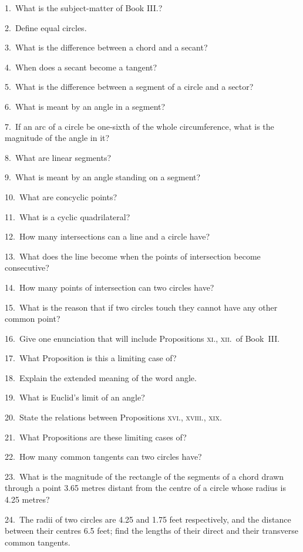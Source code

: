 \documentclass[oneside]{book}
\begin{document}
\begin{footnotesize}
1.~What is the subject-matter of Book III\@.?

2.~Define equal circles.

3.~What is the difference between a chord and a secant?

4.~When does a secant become a tangent?

5.~What is the difference between a segment of a circle and
a sector?

6.~What is meant by an angle in a segment?

7.~If an arc of a circle be one-sixth of the whole circumference,
what is the magnitude of the angle in it?

8.~What are linear segments?

9.~What is meant by an angle standing on a segment?

10.~What are concyclic points?

11.~What is a cyclic quadrilateral?

12.~How many intersections can a line and a circle have?

13.~What does the line become when the points of intersection
become consecutive?

14.~How many points of intersection can two circles have?

15.~What is the reason that if two circles touch they cannot
have any other common point?

16.~Give one enunciation that will include Propositions \textsc{xi.,
xii.}\ of Book~III\@.

17.~What Proposition is this a limiting case of?

18.~Explain the extended meaning of the word angle.

19.~What is Euclid's limit of an angle?

20.~State the relations between Propositions \textsc{xvi., xviii., xix.}

21.~What Propositions are these limiting cases of?

22.~How many common tangents can two circles have?

23.~What is the magnitude of the rectangle of the segments of
a chord drawn through a point 3.65 metres distant from the centre
of a circle whose radius is 4.25 metres?

24.~The radii of two circles are 4.25 and 1.75 feet respectively,
and the distance between their centres 6.5 feet; find the lengths
of their direct and their transverse common tangents.


\end{footnotesize}
\end{document}
